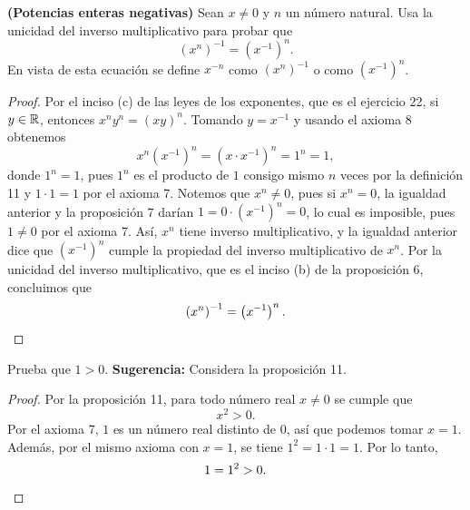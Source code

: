 \documentclass[12pt,a4paper]{article}
\begin{document}
    \thispagestyle{empty}
    

    \begin{problema}
        \textbf{(Potencias enteras negativas)} Sean $x\neq0$ y $n$ un número natural. Usa la unicidad del inverso multiplicativo para probar que
        \begin{equation*}
            \left(x^{n}\right)^{-1}=\left(x^{-1}\right)^{n}.
        \end{equation*}
        En vista de esta ecuación se define $x^{-n}$ como $\left(x^{n}\right)^{-1}$ o como $\left(x^{-1}\right)^{n}$.
    \end{problema}

    \begin{proof}
        Por el inciso (c) de las leyes de los exponentes, que es el ejercicio 22, si $y\in\mathbb{R}$, entonces $x^{n}y^{n}=(xy)^{n}$. Tomando $y=x^{-1}$ y usando el axioma 8 obtenemos
        \begin{equation*}
            x^{n}\left(x^{-1}\right)^{n}=\left(x\cdot x^{-1}\right)^{n}=1^{n}=1,
        \end{equation*}
        donde $1^{n}=1$, pues $1^{n}$ es el producto de $1$ consigo mismo $n$ veces por la definición 11 y $1\cdot1=1$ por el axioma 7.
        Notemos que $x^{n}\neq0$, pues si $x^{n}=0$, la igualdad anterior y la proposición 7 darían $1=0\cdot\left(x^{-1}\right)^{n}=0$, lo cual es imposible, pues $1\neq0$ por el axioma 7. Así, $x^{n}$ tiene inverso multiplicativo, y la igualdad anterior dice que $\left(x^{-1}\right)^{n}$ cumple la propiedad del inverso multiplicativo de $x^{n}$. Por la unicidad del inverso multiplicativo, que es el inciso (b) de la proposición 6, concluimos que
        \begin{equation*}
            \left(x^{n}\right)^{-1}=\left(x^{-1}\right)^{n}.\qedhere
        \end{equation*}
    \end{proof}

    \begin{problema}
        Prueba que $1>0$. \textbf{Sugerencia:} Considera la proposición 11.
    \end{problema}

    \begin{proof}
        Por la proposición 11, para todo número real $x\neq0$ se cumple que
        \begin{equation*}
            x^{2}>0.
        \end{equation*}
        Por el axioma 7, $1$ es un número real distinto de $0$, así que podemos tomar $x=1$. Además, por el mismo axioma con $x=1$, se tiene $1^{2}=1\cdot1=1$. Por lo tanto,
        \begin{equation*}
            1=1^{2}>0.\qedhere
        \end{equation*}
    \end{proof}
\end{document}
